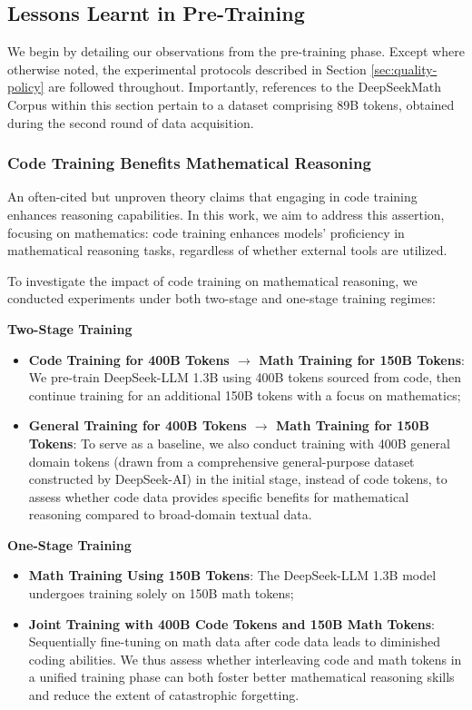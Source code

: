 \begin{itemize}[topsep=0pt]
\begin{itemize}[topsep=0pt]
\subsection{Lessons Learnt in Pre-Training}

We begin by detailing our observations from the pre-training phase. Except where otherwise noted, the experimental protocols described in Section \ref{sec:quality-policy} are followed throughout. Importantly, references to the DeepSeekMath Corpus within this section pertain to a dataset comprising 89B tokens, obtained during the second round of data acquisition.

\subsubsection{Code Training Benefits Mathematical Reasoning}

An often-cited but unproven theory claims that engaging in code training enhances reasoning capabilities. In this work, we aim to address this assertion, focusing on mathematics: code training enhances models' proficiency in mathematical reasoning tasks, regardless of whether external tools are utilized.

To investigate the impact of code training on mathematical reasoning, we conducted experiments under both two-stage and one-stage training regimes:

\textbf{Two-Stage Training}

\begin{itemize}[topsep=0pt]
    \item \textbf{Code Training for 400B Tokens $\rightarrow$ Math Training for 150B Tokens}: We pre-train DeepSeek-LLM 1.3B using 400B tokens sourced from code, then continue training for an additional 150B tokens with a focus on mathematics;
    \item \textbf{General Training for 400B Tokens $\rightarrow$ Math Training for 150B Tokens}: To serve as a baseline, we also conduct training with 400B general domain tokens (drawn from a comprehensive general-purpose dataset constructed by DeepSeek-AI) in the initial stage, instead of code tokens, to assess whether code data provides specific benefits for mathematical reasoning compared to broad-domain textual data.
\end{itemize}

\textbf{One-Stage Training}

\begin{itemize}[topsep=0pt]
    \item \textbf{Math Training Using 150B Tokens}: The DeepSeek-LLM 1.3B model undergoes training solely on 150B math tokens;
    \item \textbf{Joint Training with 400B Code Tokens and 150B Math Tokens}: Sequentially fine-tuning on math data after code data leads to diminished coding abilities. We thus assess whether interleaving code and math tokens in a unified training phase can both foster better mathematical reasoning skills and reduce the extent of catastrophic forgetting.
\end{itemize}


\end{itemize}
\end{itemize}
